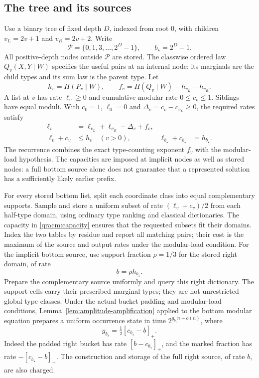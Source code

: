 \documentclass[10pt,a4paper]{article}
\theoremstyle{definition}
\begin{document}
\subsection{The tree and its sources}
Use a binary tree of fixed depth $D$, indexed from root $0$, with children
$v_L=2v+1$ and $v_R=2v+2$.  Write
\[
 \mathcal P=\{0,1,3,\ldots,2^D-1\},\qquad b_\star=2^D-1.
\]
All positive-depth nodes outside $\mathcal P$ are stored.  The classwise
ordered law $Q_v(X,Y\mid W)$ specifies the useful pairs at an internal
node: its marginals are the child types and its sum law is the parent
type.  Let
\[
 h_v=H(P_v\mid W),\qquad
 f_v=H(Q_v\mid W)-h_{v_L}-h_{v_R}.
\]
A list at $v$ has rate $\ell_v\ge0$ and cumulative modular rate
$0\le c_v\le1$.
Siblings have equal moduli.  With $c_0=1$, $\ell_0=0$ and
$\Delta_v=c_v-c_{v_L}\ge0$, the required rates satisfy
\begin{align}
 \ell_v&=\ell_{v_L}+\ell_{v_R}-\Delta_v+f_v,
 \label{qracm:recurrence}\\
 \ell_v+c_v&\le h_v\quad(v>0),&
 \ell_{b_\star}+c_{b_\star}&=h_{b_\star}.
 \label{qracm:capacity}
\end{align}
The recurrence combines the exact type-counting exponent $f_v$ with the
modular-load hypothesis.  The capacities are imposed at implicit nodes
as well as stored nodes: a full bottom source alone does not guarantee
that a represented solution has a sufficiently likely earlier prefix.

For every stored bottom list, split each coordinate class into equal
complementary supports.  Sample and store a uniform subset of rate
$(\ell_v+c_v)/2$ from each half-type domain, using ordinary type ranking
and classical dictionaries.  The capacity in \eqref{qracm:capacity}
ensures that the requested subsets fit their domains.  Index the two
tables by residue and report all matching pairs; their cost is the
maximum of the source and output rates under the modular-load condition.
For
the implicit bottom source, use support fraction $\rho=1/3$ for the
stored right domain, of rate
\[
 b=\rho h_{b_\star}.
\]
Prepare the complementary source uniformly and query this right
dictionary.  The support cells carry their prescribed marginal types;
they are not unrestricted global type classes.  Under the actual bucket
padding and modular-load conditions, Lemma~\ref{lem:amplitude-amplification} applied to the
bottom modular equation prepares a uniform occurrence state in time
$2^{g_{b_\star}n+o(n)}$, where
\begin{equation}
 g_{b_\star}=\tfrac12[c_{b_\star}-b]_+.
 \label{qracm:bottom-generator}
\end{equation}
Indeed the padded right bucket has rate $[b-c_{b_\star}]_+$, and the
marked fraction has rate $-[c_{b_\star}-b]_+$.  The construction and
storage of the full right source, of rate $b$, are also charged.
\end{document}
